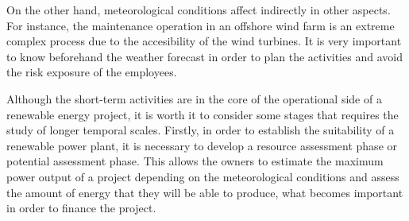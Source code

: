 
On the other hand, meteorological conditions affect indirectly in other aspects. For instance, the maintenance operation in an offshore wind farm is an extreme complex process due to the accesibility of the wind turbines. It is very important to know beforehand the weather forecast in order to plan the activities and avoid the risk exposure of the employees.


Although the short-term activities are in the core of the operational side of a renewable energy project, it is worth it to consider some stages that requires the study of longer temporal scales. Firstly, in order to establish the suitability of a renewable power plant, it is necessary to develop a resource assessment phase or potential assessment phase. This allows the owners to estimate the maximum power output of a project depending on the meteorological conditions and assess the amount of energy that they will be able to produce, what becomes important in order to finance the project.  



